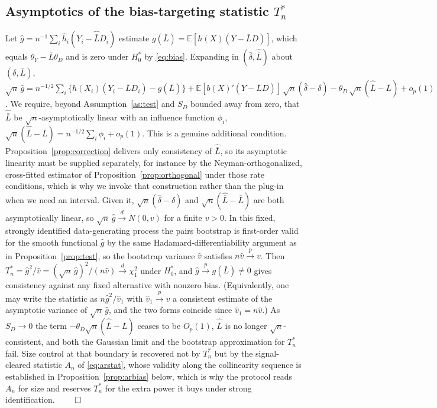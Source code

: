 \documentclass[preprint,11pt,authoryear]{elsarticle}
\theoremstyle{definition}
\newcommand{\E}{\mathbb{E}}
\newcommand{\convd}{\overset{d}{\longrightarrow}}
\newcommand{\convp}{\overset{p}{\longrightarrow}}
\begin{document}
\subsection*{Asymptotics of the bias-targeting statistic $T_n^{\ast}$}
Let $\hat g=n^{-1}\sum_i\hat h_i(Y_i-\hat{\bar L}D_i)$ estimate
$g(\bar L)=\E[h(X)(Y-\bar L D)]$, which equals $\theta_Y-\bar L\theta_D$ and is
zero under $H_0^{\ast}$ by \eqref{eq:bias}. Expanding in $(\hat\delta,\hat{\bar L})$
about $(\delta,\bar L)$,
$\sqrt n\,\hat g=n^{-1/2}\sum_i\{h(X_i)(Y_i-\bar L D_i)-g(\bar L)\}
+\E[b(X)'(Y-\bar L D)]\,\sqrt n(\hat\delta-\delta)
-\theta_D\,\sqrt n(\hat{\bar L}-\bar L)+o_p(1)$.
We require, beyond Assumption~\ref{as:test} and $S_D$ bounded away from zero, that
$\hat{\bar L}$ be $\sqrt n$-asymptotically linear with an influence function
$\phi_i$, $\sqrt n(\hat{\bar L}-\bar L)=n^{-1/2}\sum_i\phi_i+o_p(1)$. This is a
genuine additional condition. Proposition~\ref{prop:correction} delivers only
consistency of $\hat{\bar L}$, so its asymptotic linearity must be supplied
separately, for instance by the Neyman-orthogonalized, cross-fitted estimator of
Proposition~\ref{prop:orthogonal} under those rate
conditions, which is why we invoke that construction rather than the plug-in when we
need an interval. Given it, $\sqrt n(\hat\delta-\delta)$ and
$\sqrt n(\hat{\bar L}-\bar L)$ are both asymptotically linear, so
$\sqrt n\,\hat g\convd N(0,v)$ for a finite $v>0$. In this fixed, strongly identified
data-generating process the pairs bootstrap is first-order valid for the smooth
functional $\hat g$ by the same Hadamard-differentiability argument as in
Proposition~\ref{prop:test}, so the bootstrap variance $\hat v$ satisfies
$n\hat v\convp v$. Then
$T_n^{\ast}=\hat g^2/\hat v=(\sqrt n\,\hat g)^2/(n\hat v)\convd\chi^2_1$
under $H_0^{\ast}$, and $\hat g\convp g(\bar L)\neq0$ gives consistency against any
fixed alternative with nonzero bias. (Equivalently, one may write the statistic as
$n\hat g^2/\hat v_1$ with $\hat v_1\convp v$ a consistent estimate of the asymptotic
variance of $\sqrt n\,\hat g$, and the two forms coincide since $\hat v_1=n\hat v$.) As
$S_D\to0$ the term $-\theta_D\sqrt n(\hat{\bar L}-\bar L)$ ceases to be $O_p(1)$,
$\hat{\bar L}$ is no longer $\sqrt n$-consistent, and both the Gaussian limit and the
bootstrap approximation for $T_n^{\ast}$ fail. Size control at that boundary is
recovered not by $T_n^{\ast}$ but by the signal-cleared statistic $A_n$ of
\eqref{eq:arstat}, whose validity along the collinearity sequence is established in
Proposition~\ref{prop:arbias} below, which is why the protocol reads $A_n$ for size
and reserves $T_n^{\ast}$ for the extra power it buys under strong identification.
\hfill$\qed$
\end{document}
